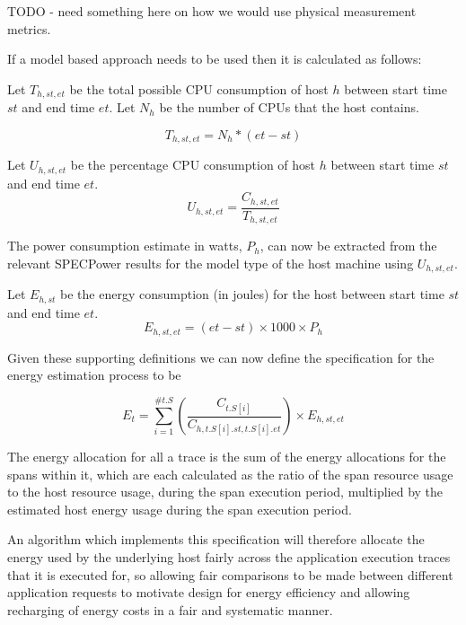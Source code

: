 TODO - need something here on how we would use physical measurement metrics.


If a model based approach needs to be used then it is calculated as follows:

Let $T_{h,st,et}$ be the total possible CPU consumption of host $h$ between start time $st$ and end time $et$.  Let $N_{h}$ be the number of CPUs that the host contains.

\begin{equation}
T_{h,st,et} = N_{h} * (et - st)
\end{equation}

Let $U_{h,st,et}$ be the percentage CPU consumption of host $h$ between start time $st$ and end time $et$.
\begin{equation}
U_{h,st,et} = \frac{C_{h,st,et}}{T_{h,st,et}}
\end{equation}

The power consumption estimate in watts, $P_{h}$, can now be extracted from the relevant SPECPower results for the model type of the host machine using $U_{h,st,et}$.

Let $E_{h,st}$ be the energy consumption (in joules) for the host between start time $st$ and end time $et$.
\begin{equation}
E_{h,st,et} = (et - st) \times 1000 \times P_{h}
\end{equation}


Given these supporting definitions we can now define the specification for the energy estimation process to be

\begin{equation}
E_{t} = \sum_{i=1}^{\#t.S} ( \frac {C_{t.S[i]}} {C_{h,t.S[i].st,t.S[i].et}} ) \times E_{h, st, et}
\end{equation}

The energy allocation for all a trace is the sum of the energy allocations for the spans within it, which are each calculated as the ratio of the span resource usage to the host resource usage, during the span execution period, multiplied by the estimated host energy usage during the span execution period.

An algorithm which implements this specification will therefore allocate the energy used by the underlying host fairly across the application execution traces that it is executed for, so allowing fair comparisons to be made between different application requests to motivate design for energy efficiency and allowing recharging of energy costs in a fair and systematic manner.












